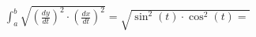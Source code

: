 \documentclass[preview]{standalone}
\begin{document}
\begin{align*}
\int_{a}^{b} \sqrt{\left(\frac{dy}{dt}\right)^2 \cdot \left(\frac{dx}{dt}\right)^2} = \sqrt{\sin^2 \left(t\right) \cdot \cos^2 \left(t\right) =}
\end{align*}
\end{document}
